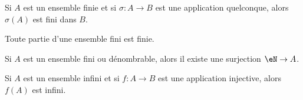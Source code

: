 \begin{lemma}       \label{LEMooGRGFooSWDeMA}
    Si \( A\) est un ensemble finie et si \( \sigma\colon A\to B\) est une application quelconque, alors \( \sigma(A)\) est fini dans \( B\).
\end{lemma}

\begin{lemma}       \label{LEMooTUIRooEXjfDY}
    Toute partie d'une ensemble fini est finie.
\end{lemma}

\begin{lemma}       \label{LEMooSRZWooASgEfy}
    Si \( A\) est un ensemble fini ou dénombrable, alors il existe une surjection \( \eN\to A\).
\end{lemma}

\begin{lemma}        \label{LEMooXPSQooRaSrxv}
    Si \( A\) est un ensemble infini et si \( f\colon A\to B\) est une application injective, alors \( f(A)\) est infini.
\end{lemma}

